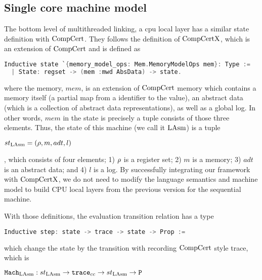 

\subsection{Single core machine model}
\label{chapter:linking:subsec:cpu-local-layer-interface}

The bottom level of multithreaded linking, a cpu local layer has a similar state definition with $\mathrm{CompCert}$. 
They follows the definition of $\mathrm{CompCertX}$, 
which is an extension of $\mathrm{CompCert}$ and is defined as
\begin{lstlisting}[language=C]
Inductive state `{memory_model_ops: Mem.MemoryModelOps mem}: Type :=
  | State: regset -> (mem :mwd AbsData) -> state.
\end{lstlisting}
where the memory, $mem$, is an extension of $\mathrm{CompCert}$ memory which  contains a memory itself (a partial map from a identifier to the value), an abstract data (which is a collection of abstract data representations), as well as
a global log.
In other words, 
$mem$ in the state is precisely a tuple consists of those three elements.
Thus, the state of this machine (we call it $\mathrm{LAsm}$) is  a tuple
\begin{center}
$st_{\mathrm{LAsm}} = (\rho, m, adt, l)$ 
\end{center}
, which consists of four elements; 1) $\rho$ is a register set;
2)  $m$ is a memory; 3) $adt$ is an abstract data; and 4) $l$ is a log.
By successfully integrating our framework with $\mathrm{CompCertX}$, we do not need to modify the language semantics and machine model to build CPU local layers from the previous version for the sequential machine. 

With those definitions, the evaluation transition relation has a type
\begin{lstlisting}[language=C]
  Inductive step: state -> trace -> state -> Prop :=
\end{lstlisting}
which change the state by the transition with recording $\mathrm{CompCert}$ style trace,
which is 
\begin{center}
${\mathrm{\texttt{Mach}}}_{\mathrm{LAsm}}: st_{\mathrm{LAsm}} \rightarrow {\mathrm{\texttt{trace}}_{cc}} \rightarrow st_{\mathrm{LAsm}} \rightarrow {{\mathrm{\texttt{P}}}}$
\end{center}

